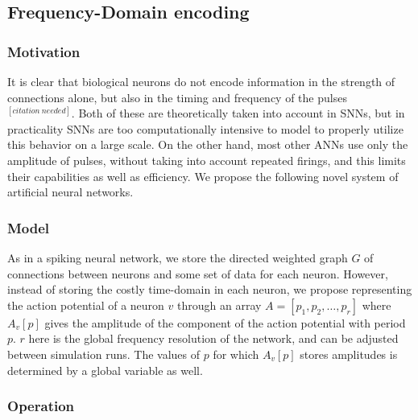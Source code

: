 \documentclass{article}
\begin{document}
\subsection{Frequency-Domain encoding}

\subsubsection{Motivation}

It is clear that biological neurons do not encode information in the strength of connections alone, but also in the timing and frequency of the pulses $^{[citation \ needed]}$. Both of these are theoretically taken into account in SNNs, but in practicality SNNs are too computationally intensive to model to properly utilize this behavior on a large scale. On the other hand, most other ANNs use only the amplitude of pulses, without taking into account repeated firings, and this limits their capabilities as well as efficiency. We propose the following novel system of artificial neural networks.

\subsubsection{Model}

As in a spiking neural network, we store the directed weighted graph $G$ of connections between neurons and some set of data for each neuron. However, instead of storing the costly time-domain in each neuron, we propose representing the action potential of a neuron $v$ through an array $A = [p_1, p_2, \ldots, p_r]$ where $A_v[p]$ gives the amplitude of the component of the action potential with period $p$. $r$ here is the global frequency resolution of the network, and can be adjusted between simulation runs. The values of $p$ for which $A_v[p]$ stores amplitudes is determined by a global variable as well. 

\subsubsection{Operation}







\newpage
\end{document}
